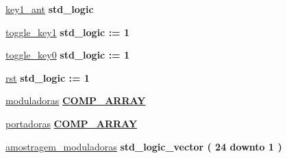 \begin{DoxyCompactItemize}
\hyperlink{class_d_e0___n_a_n_o___v_f_1_1_m_a_i_n_a0b9ce6db8062ecd0f9d69def89105987}{key1\+\_\+ant} {\bfseries \textcolor{comment}{std\+\_\+logic}\textcolor{vhdlchar}{ }} 
\item 
\hyperlink{class_d_e0___n_a_n_o___v_f_1_1_m_a_i_n_ad4bd17174568b8107646eaedcb91db57}{toggle\+\_\+key1} {\bfseries \textcolor{comment}{std\+\_\+logic}\textcolor{vhdlchar}{ }\textcolor{vhdlchar}{ }\textcolor{vhdlchar}{\+:}\textcolor{vhdlchar}{=}\textcolor{vhdlchar}{ }\textcolor{vhdlchar}{ }\textcolor{vhdlchar}{\textquotesingle{}}\textcolor{vhdlchar}{ } \textcolor{vhdldigit}{1} \textcolor{vhdlchar}{ }\textcolor{vhdlchar}{\textquotesingle{}}\textcolor{vhdlchar}{ }} 
\item 
\hyperlink{class_d_e0___n_a_n_o___v_f_1_1_m_a_i_n_aee0f593b549f4d44efc60ee1dc9d6e57}{toggle\+\_\+key0} {\bfseries \textcolor{comment}{std\+\_\+logic}\textcolor{vhdlchar}{ }\textcolor{vhdlchar}{ }\textcolor{vhdlchar}{\+:}\textcolor{vhdlchar}{=}\textcolor{vhdlchar}{ }\textcolor{vhdlchar}{ }\textcolor{vhdlchar}{\textquotesingle{}}\textcolor{vhdlchar}{ } \textcolor{vhdldigit}{1} \textcolor{vhdlchar}{ }\textcolor{vhdlchar}{\textquotesingle{}}\textcolor{vhdlchar}{ }} 
\item 
\hyperlink{class_d_e0___n_a_n_o___v_f_1_1_m_a_i_n_aba08e76a6c0f411322cb6e1d3c6a2aea}{rst} {\bfseries \textcolor{comment}{std\+\_\+logic}\textcolor{vhdlchar}{ }\textcolor{vhdlchar}{ }\textcolor{vhdlchar}{\+:}\textcolor{vhdlchar}{=}\textcolor{vhdlchar}{ }\textcolor{vhdlchar}{ }\textcolor{vhdlchar}{\textquotesingle{}}\textcolor{vhdlchar}{ } \textcolor{vhdldigit}{1} \textcolor{vhdlchar}{ }\textcolor{vhdlchar}{\textquotesingle{}}\textcolor{vhdlchar}{ }} 
\item 
\hyperlink{class_d_e0___n_a_n_o___v_f_1_1_m_a_i_n_a47ba0ff21bd9be77c5cd321b7b3172f6}{moduladoras} {\bfseries {\bfseries \hyperlink{classmy__types__pkg_ae9b90869e95e036baa1ead1b6238589a}{C\+O\+M\+P\+\_\+\+A\+R\+R\+A\+Y}} \textcolor{vhdlchar}{ }} 
\item 
\hyperlink{class_d_e0___n_a_n_o___v_f_1_1_m_a_i_n_aa467a8e78b1fa6ca29b44bf1953b92ce}{portadoras} {\bfseries {\bfseries \hyperlink{classmy__types__pkg_ae9b90869e95e036baa1ead1b6238589a}{C\+O\+M\+P\+\_\+\+A\+R\+R\+A\+Y}} \textcolor{vhdlchar}{ }} 
\item 
\hyperlink{class_d_e0___n_a_n_o___v_f_1_1_m_a_i_n_a54f1550516e9d6e1b2e97bea8efd37b1}{amostragem\+\_\+moduladoras} {\bfseries \textcolor{comment}{std\+\_\+logic\+\_\+vector}\textcolor{vhdlchar}{ }\textcolor{vhdlchar}{(}\textcolor{vhdlchar}{ }\textcolor{vhdlchar}{ } \textcolor{vhdldigit}{24} \textcolor{vhdlchar}{ }\textcolor{keywordflow}{downto}\textcolor{vhdlchar}{ }\textcolor{vhdlchar}{ } \textcolor{vhdldigit}{1} \textcolor{vhdlchar}{ }\textcolor{vhdlchar}{)}\textcolor{vhdlchar}{ }} 

\end{DoxyCompactItemize}
